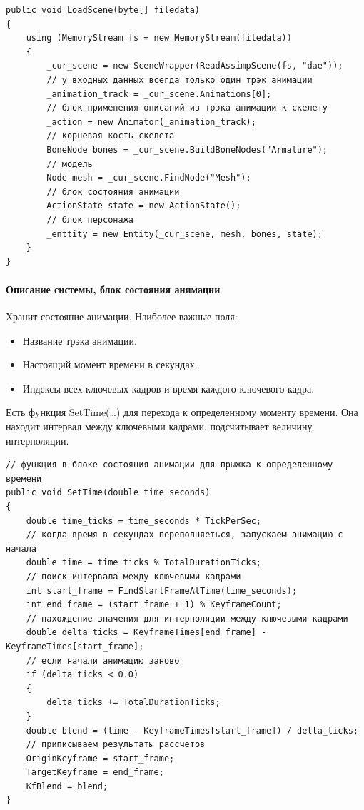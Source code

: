 \begin{scriptsize}
\begin{verbatim}
public void LoadScene(byte[] filedata)
{
    using (MemoryStream fs = new MemoryStream(filedata))
    {
        _cur_scene = new SceneWrapper(ReadAssimpScene(fs, "dae"));
        // у входных данных всегда только один трэк анимации
        _animation_track = _cur_scene.Animations[0];
        // блок применения описаний из трэка анимации к скелету
        _action = new Animator(_animation_track);
        // корневая кость скелета
        BoneNode bones = _cur_scene.BuildBoneNodes("Armature");
        // модель
        Node mesh = _cur_scene.FindNode("Mesh");
        // блок состояния анимации
        ActionState state = new ActionState();
        // блок персонажа
        _enttity = new Entity(_cur_scene, mesh, bones, state);
    }
}
\end{verbatim}
\end{scriptsize}


\paragraph{Описание системы, блок состояния анимации}
Хранит состояние анимации. Наиболее важные поля:
\begin{itemize}
\item Название трэка анимации.
\item Настоящий момент времени в секундах.
\item Индексы всех ключевых кадров и время каждого ключевого кадра.
\end{itemize}

Есть фyнкция SetTime(\dots) для перехода к определенному моменту времени. Она находит интервал между ключевыми кадрами, подсчитывает величину интерполяции.

\begin{verbatim}
// функция в блоке состояния анимации для прыжка к определенному времени
public void SetTime(double time_seconds)
{            
    double time_ticks = time_seconds * TickPerSec;
    // когда время в секундах переполняеться, запускаем анимацию с начала
    double time = time_ticks % TotalDurationTicks;
    // поиск интервала между ключевыми кадрами
    int start_frame = FindStartFrameAtTime(time_seconds);
    int end_frame = (start_frame + 1) % KeyframeCount;
    // нахождение значения для интерполяции между ключевыми кадрами
    double delta_ticks = KeyframeTimes[end_frame] - KeyframeTimes[start_frame];
    // если начали анимацию заново
    if (delta_ticks < 0.0)
    {
        delta_ticks += TotalDurationTicks;
    }
    double blend = (time - KeyframeTimes[start_frame]) / delta_ticks;
    // приписываем результаты рассчетов
    OriginKeyframe = start_frame;
    TargetKeyframe = end_frame;
    KfBlend = blend;
}
\end{verbatim}



